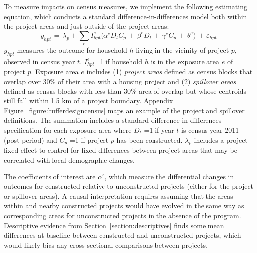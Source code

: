 \documentclass[12pt]{article}
\begin{document}
To measure impacts on census measures, we implement the following estimating equation, which conducts a standard difference-in-differences model both within the project areas and just outside of the project areas:
\begin{equation*}
y_{hpt} \, = \, \lambda_p + \sum\limits_{e} I^e_{hpt}\Big( \alpha^e D_tC_p \, + \, \beta^eD_t \, + \, \gamma^eC_p \, + \, \theta^e \Big) \, + \, \varepsilon_{hpt}
\end{equation*}
$y_{hpt}$ measures the outcome for household $h$ living in the vicinity of project $p$, observed in census year $t$.  $I^e_{hpt}$=1 if household $h$ is in the exposure area $e$ of project $p$.  Exposure area $e$ includes (1) {\it project areas} defined as census blocks that overlap over 30\% of their area with a housing project and (2) {\it spillover areas} defined as census blocks with less than 30\% area of overlap but whose centroids still fall within 1.5 km of a project boundary.  Appendix Figure~\ref{figure:bufferdesigncensus} maps an example of the project and spillover definitions.  The summation includes a standard difference-in-differences specification for each exposure area where $D_{t}\,\,$=1 if year $t$ is census year 2011 (post period) and $C_{p}\,\,$=1 if project $p$ has been constructed.  $\lambda_p$ includes a project fixed-effect to control for fixed differences between project areas that may be correlated with local demographic changes.  

The coefficients of interest are $\alpha^e$, which measure the differential changes in outcomes for constructed relative to unconstructed projects (either for the project or spillover areas).  A causal interpretation requires assuming that the areas within and nearby constructed projects would have evolved in the same way as corresponding areas for unconstructed projects in the absence of the program.  Descriptive evidence from Section~\ref{section:descriptives} finds some mean differences at baseline between constructed and unconstructed projects, which would likely bias any cross-sectional comparisons between projects. 

\end{document}
